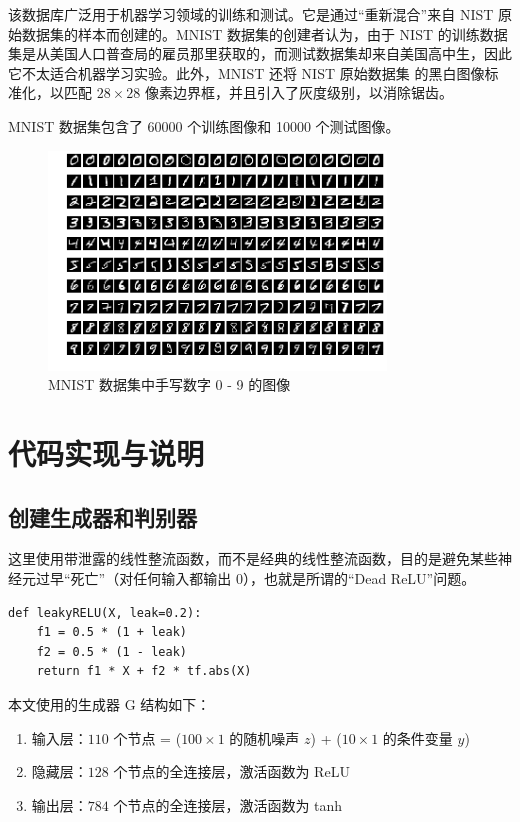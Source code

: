 \documentclass[a4paper, 12pt]{article}
\begin{document}
该数据库广泛用于机器学习领域的训练和测试。它是通过“重新混合”来自 NIST 原始数据集的样本而创建的。MNIST 数据集的创建者认为，由于 NIST 的训练数据集是从美国人口普查局的雇员那里获取的，而测试数据集却来自美国高中生，因此它不太适合机器学习实验。此外，MNIST 还将 NIST 原始数据集 的黑白图像标准化，以匹配 $28 \times 28$ 像素边界框，并且引入了灰度级别，以消除锯齿。

MNIST 数据集包含了 60000 个训练图像和 10000 个测试图像。


\begin{figure}[htbp]
\centering
\includegraphics[width=0.8\textwidth]{images/dataset_preview.png}
\caption{MNIST 数据集中手写数字 0 - 9 的图像}
\end{figure}

\section{代码实现与说明}

\subsection{创建生成器和判别器}
这里使用带泄露的线性整流函数，而不是经典的线性整流函数，目的是避免某些神经元过早“死亡”（对任何输入都输出 0），也就是所谓的“Dead ReLU”问题。

\begin{lstlisting}[style=myPython,caption={带泄露的线性整流函数}]
def leakyRELU(X, leak=0.2):
    f1 = 0.5 * (1 + leak)
    f2 = 0.5 * (1 - leak)
    return f1 * X + f2 * tf.abs(X)
\end{lstlisting}

本文使用的生成器 G 结构如下：

\begin{enumerate}[leftmargin=*,labelindent=2em]
\item 输入层：$110$ 个节点 = ($100 \times 1$ 的随机噪声 $z$) + ($10 \times 1$ 的条件变量 $y$)
\item 隐藏层：$128$ 个节点的全连接层，激活函数为 ReLU
\item 输出层：$784$ 个节点的全连接层，激活函数为 tanh
\end{enumerate}
\end{document}
